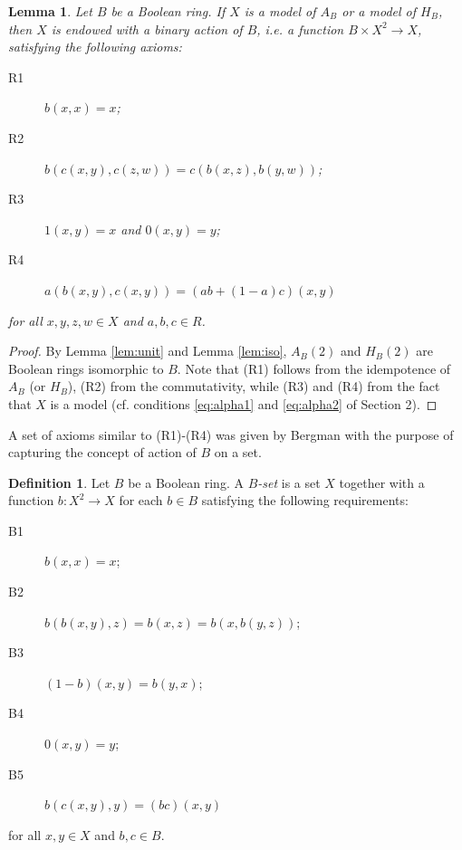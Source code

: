 \documentclass{amsart}
\numberwithin{equation}{section}
\theoremstyle{plain}
\newtheorem{lemma}[theorem]{Lemma}
\theoremstyle{definition}
\newtheorem{definition}[theorem]{Definition}
\begin{document}
\begin{lemma}
  \label{prop:nec}
  Let $B$ be a Boolean ring. 
  If $X$ is a model of $A_B$ or a model of $H_B$, then $X$ is endowed with a binary action of $B$, i.e. a function $B\times X^2 \to X$, satisfying the following axioms:
\begin{description}
  \item[R1] $b(x,x)=x$; 
  \item[R2] $b(c(x,y), c(z,w)) = c(b(x,z),b(y,w))$; 
  \item[R3] $1(x,y) =x$ and $0(x,y)=y$; 
  \item[R4] $a(b(x,y),c(x,y)) = (ab+(1-a)c)(x,y)$   
\end{description}
for all $x,y,z,w \in X$ and $a,b,c \in R$. 
\end{lemma}
\begin{proof}
  By Lemma \ref{lem:unit} and Lemma \ref{lem:iso}, $A_B(2)$ and $H_B(2)$ are Boolean rings isomorphic to $B$. 
  Note that (R1) follows from the idempotence of $A_B$ (or $H_B$), (R2) from the commutativity, while (R3) and (R4) from the fact that $X$ is a model (cf. conditions \eqref{eq:alpha1} and \eqref{eq:alpha2} of Section 2). 
\end{proof}
 

A set of axioms similar to (R1)-(R4) was given by Bergman with the purpose of capturing the concept of action of $B$ on a set.

\begin{definition} \cite[Definition 7]{B91}
  \label{def:bset}
  Let $B$ be a Boolean ring. 
  A \emph{$B$-set} is a set $X$ together with a function $b: X^2 \to X$ for each $b \in B$ satisfying the following requirements: 
\begin{description}
  \item[B1] $b(x,x)=x$; 
  \item[B2] $b(b(x,y), z) = b(x,z)= b(x,b(y,z))$; 
  \item[B3] $(1-b)(x,y)=b(y,x)$;    
  \item[B4] $0(x,y) =y$;
  \item[B5] $b(c(x,y),y)=(bc)(x,y)$  
\end{description}
for all $x,y \in X$ and $b,c \in B$. 
\end{definition}
\end{document}
